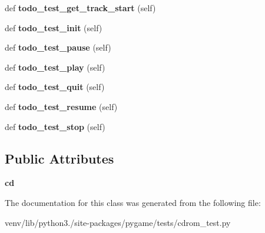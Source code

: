 \begin{DoxyCompactItemize}
def {\bfseries todo\+\_\+test\+\_\+get\+\_\+track\+\_\+start} (self)
\item 
\mbox{\label{classpygame_1_1tests_1_1cdrom__test_1_1_c_d_type_test_afa21e3c9f74492dca84b2db8c256de65}} 
def {\bfseries todo\+\_\+test\+\_\+init} (self)
\item 
\mbox{\label{classpygame_1_1tests_1_1cdrom__test_1_1_c_d_type_test_a59c046255913af5edd064b84bccbc671}} 
def {\bfseries todo\+\_\+test\+\_\+pause} (self)
\item 
\mbox{\label{classpygame_1_1tests_1_1cdrom__test_1_1_c_d_type_test_a04baf0e1ee1bc25d12038e125de97593}} 
def {\bfseries todo\+\_\+test\+\_\+play} (self)
\item 
\mbox{\label{classpygame_1_1tests_1_1cdrom__test_1_1_c_d_type_test_ae6d27067f127aefe5aa2687bc0c52880}} 
def {\bfseries todo\+\_\+test\+\_\+quit} (self)
\item 
\mbox{\label{classpygame_1_1tests_1_1cdrom__test_1_1_c_d_type_test_a91db76813b6fec9bce7538433c434d1b}} 
def {\bfseries todo\+\_\+test\+\_\+resume} (self)
\item 
\mbox{\label{classpygame_1_1tests_1_1cdrom__test_1_1_c_d_type_test_ab2602719b51817a89656b2d4eccd250c}} 
def {\bfseries todo\+\_\+test\+\_\+stop} (self)
\end{DoxyCompactItemize}
\subsection*{Public Attributes}
\begin{DoxyCompactItemize}
\item 
\mbox{\label{classpygame_1_1tests_1_1cdrom__test_1_1_c_d_type_test_a822f3e632e5c8307f27a770c54f1c8fe}} 
{\bfseries cd}
\end{DoxyCompactItemize}


The documentation for this class was generated from the following file\+:\begin{DoxyCompactItemize}
\item 
venv/lib/python3./site-\/packages/pygame/tests/cdrom\+\_\+test.\+py\end{DoxyCompactItemize}
